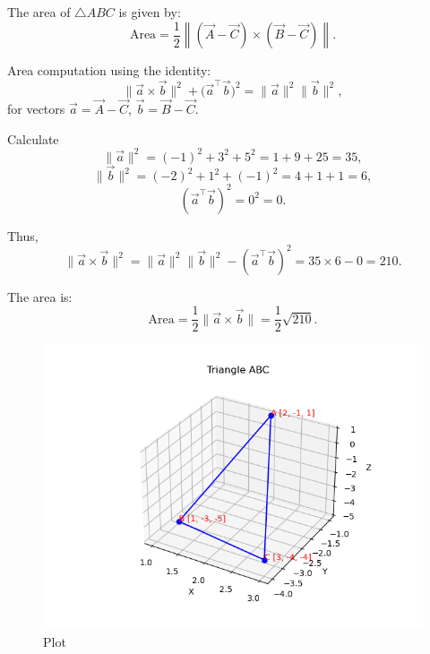 \documentclass[12pt]{article}
\begin{document}
The area of \(\triangle ABC\) is given by:
\[
\text{Area} = \frac{1}{2} \left\| (\vec{A} - \vec{C}) \times (\vec{B} - \vec{C}) \right\|.
\]

Area computation using the identity:
\[
\| \vec{a} \times \vec{b} \|^2 + \big( \vec{a}^\top \vec{b} \big)^2 = \|\vec{a}\|^2 \|\vec{b}\|^2,
\]
for vectors \( \vec{a} = \vec{A} - \vec{C} \), \( \vec{b} = \vec{B} - \vec{C} \).

Calculate
\[
\|\vec{a}\|^2 = (-1)^2 + 3^2 + 5^2 = 1 + 9 + 25 = 35,
\]
\[
\|\vec{b}\|^2 = (-2)^2 + 1^2 + (-1)^2 = 4 + 1 + 1 = 6,
\]
\[
(\vec{a}^\top \vec{b})^2 = 0^2 = 0.
\]

Thus,
\[
\| \vec{a} \times \vec{b} \|^2 = \|\vec{a}\|^2 \|\vec{b}\|^2 - (\vec{a}^\top \vec{b})^2 = 35 \times 6 - 0 = 210.
\]

The area is:
\[
\text{Area} = \frac{1}{2} \| \vec{a} \times \vec{b} \| = \frac{1}{2} \sqrt{210}.
\]
\begin{figure}[H]
	\centering
	\includegraphics[width = 0.8\columnwidth]{Figs/Figure_1.png}
	\caption{Plot}
    \label{fig:placeholder}
\end{figure}
\end{document}

